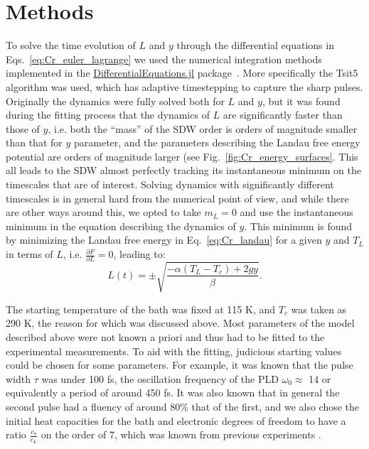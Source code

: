 \section{Methods}
To solve the time evolution of $L$ and $y$ through the differential equations in Eqs.~\ref{eq:Cr_euler_lagrange} we used the numerical integration methods implemented in the \href{https://github.com/SciML/DifferentialEquations.jl}{DifferentialEquations.jl} package~\cite{rackauckas2017differentialequations}. More specifically the Tsit5 algorithm was used, which has adaptive timestepping to capture the sharp pulses.
Originally the dynamics were fully solved both for $L$ and $y$, but it was found during the fitting process that the dynamics of $L$ are significantly faster than those of $y$, i.e. both the ``mass'' of the SDW order is orders of magnitude smaller than that for $y$ parameter, and the parameters describing the Landau free energy potential are orders of magnitude larger (see Fig.~\ref{fig:Cr_energy_surfaces}.
This all leads to the SDW almost perfectly tracking its instantaneous minimum on the timescales that are of interest.
Solving dynamics with significantly different timescales is in general hard from the numerical point of view, and while there are other ways around this, we opted to take $m_L = 0$ and use the instantaneous minimum in the equation describing the dynamics of $y$.
This minimum is found by minimizing the Landau free energy in Eq.~\ref{eq:Cr_landau} for a given $y$ and $T_L$ in terms of $L$, i.e. $\frac{\partial F}{\partial L} = 0$, leading to:
\begin{equation}
	L(t) = \pm \sqrt{\frac{- \alpha (T_L - T_c) + 2 g y}{\beta}}.
\end{equation}

The starting temperature of the bath was fixed at 115 K, and $T_c$ was taken as 290 K, the reason for which was discussed above.
Most parameters of the model described above were not known a priori and thus had to be fitted to the experimental measurements. To aid with the fitting, judicious starting values could be chosen for some parameters. For example, it was known that the pulse width $\tau$ was under 100 fs, the oscillation frequency of the PLD $\omega_0 \approx$ 14 or equivalently a period of around 450 fs. It was also known that in general the second pulse had a fluency of around 80\% that of the first, and we also chose the initial heat capacities for the bath and electronic degrees of freedom to have a ratio $\frac{c_b}{c_L}$ on the order of 7, which was known from previous experiments .


